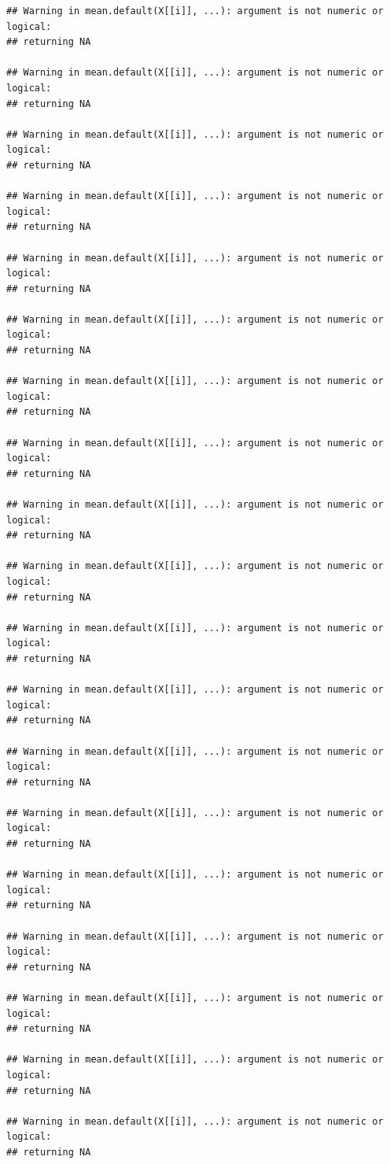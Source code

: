 \documentclass[]{gitbook}
\begin{document}
\begin{verbatim}
## Warning in mean.default(X[[i]], ...): argument is not numeric or logical:
## returning NA

## Warning in mean.default(X[[i]], ...): argument is not numeric or logical:
## returning NA

## Warning in mean.default(X[[i]], ...): argument is not numeric or logical:
## returning NA

## Warning in mean.default(X[[i]], ...): argument is not numeric or logical:
## returning NA

## Warning in mean.default(X[[i]], ...): argument is not numeric or logical:
## returning NA

## Warning in mean.default(X[[i]], ...): argument is not numeric or logical:
## returning NA

## Warning in mean.default(X[[i]], ...): argument is not numeric or logical:
## returning NA

## Warning in mean.default(X[[i]], ...): argument is not numeric or logical:
## returning NA

## Warning in mean.default(X[[i]], ...): argument is not numeric or logical:
## returning NA

## Warning in mean.default(X[[i]], ...): argument is not numeric or logical:
## returning NA

## Warning in mean.default(X[[i]], ...): argument is not numeric or logical:
## returning NA

## Warning in mean.default(X[[i]], ...): argument is not numeric or logical:
## returning NA

## Warning in mean.default(X[[i]], ...): argument is not numeric or logical:
## returning NA

## Warning in mean.default(X[[i]], ...): argument is not numeric or logical:
## returning NA

## Warning in mean.default(X[[i]], ...): argument is not numeric or logical:
## returning NA

## Warning in mean.default(X[[i]], ...): argument is not numeric or logical:
## returning NA

## Warning in mean.default(X[[i]], ...): argument is not numeric or logical:
## returning NA

## Warning in mean.default(X[[i]], ...): argument is not numeric or logical:
## returning NA

## Warning in mean.default(X[[i]], ...): argument is not numeric or logical:
## returning NA


\end{verbatim}
\end{document}
